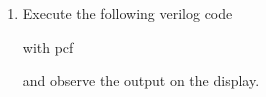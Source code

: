 \documentclass[journal,12pt,twocolumn]{IEEEtran}
\begin{document}
\begin{enumerate}
    \item Execute the following verilog code

    
with  pcf
            
and observe the output on the display.


    
    

\end{enumerate}
 
\end{document}
